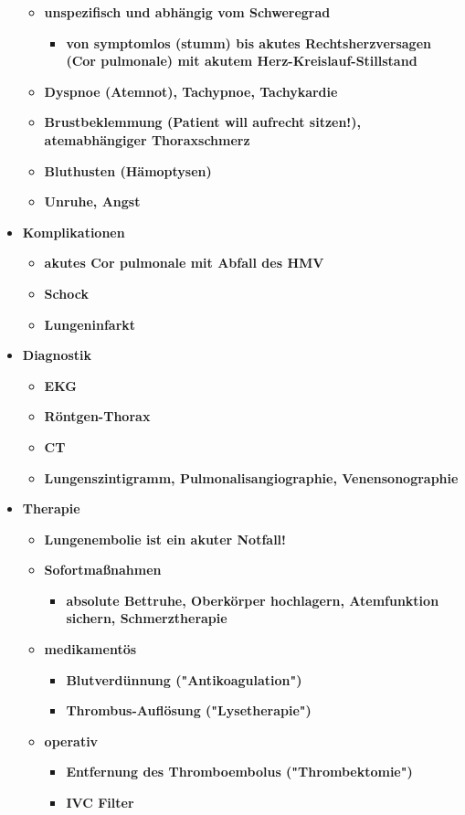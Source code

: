 \begin{itemize}
\begin{itemize}
					\item \textbf{unspezifisch und abhängig vom Schweregrad}
						\begin{itemize}
							\item \textbf{von symptomlos (stumm) bis akutes Rechtsherzversagen (Cor pulmonale) mit akutem Herz-Kreislauf-Stillstand}
						\end{itemize}
					\item \textbf{Dyspnoe (Atemnot), Tachypnoe, Tachykardie}
					\item \textbf{Brustbeklemmung (Patient will aufrecht sitzen!), atemabhängiger Thoraxschmerz}
					\item \textbf{Bluthusten (Hämoptysen)}
					\item \textbf{Unruhe, Angst}
				\end{itemize}
			\item \textbf{Komplikationen}
				\begin{itemize}
					\item \textbf{akutes Cor pulmonale mit Abfall des HMV}
					\item \textbf{Schock}
					\item \textbf{Lungeninfarkt}
				\end{itemize}
			\item \textbf{Diagnostik}
				\begin{itemize}
					\item \textbf{EKG}
					\item \textbf{Röntgen-Thorax}
					\item \textbf{CT}
					\item \textbf{Lungenszintigramm, Pulmonalisangiographie, Venensonographie}
				\end{itemize}
			\item \textbf{Therapie}
				\begin{itemize}
					\item \textbf{Lungenembolie ist ein akuter Notfall!}
					\item \textbf{Sofortmaßnahmen}
						\begin{itemize}
							\item \textbf{absolute Bettruhe, Oberkörper hochlagern, Atemfunktion sichern, Schmerztherapie}
						\end{itemize}
					\item \textbf{medikamentös}
						\begin{itemize}
							\item \textbf{Blutverdünnung ("Antikoagulation")}
							\item \textbf{Thrombus-Auflösung ("Lysetherapie")}
						\end{itemize}
					\item \textbf{operativ}
						\begin{itemize}
							\item \textbf{Entfernung des Thromboembolus ("Thrombektomie")}
							\item \textbf{IVC Filter}
						\end{itemize}
				\end{itemize}
		\end{itemize}
